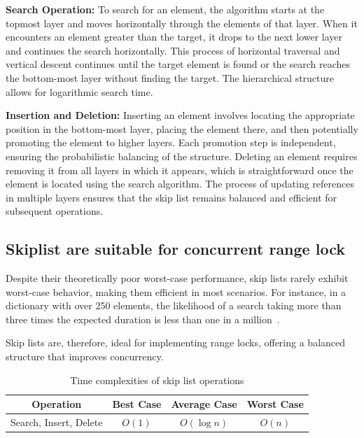 \textbf{Search Operation:} To search for an element, the algorithm starts at the topmost layer and moves horizontally through the elements of that layer.
When it encounters an element greater than the target, it drops to the next lower layer and continues the search horizontally.
This process of horizontal traversal and vertical descent continues until the target element is found or the search reaches the bottom-most layer without finding the target.
The hierarchical structure allows for logarithmic search time.

\textbf{Insertion and Deletion:} Inserting an element involves locating the appropriate position in the bottom-most layer, placing the element there, and then potentially promoting the element to higher layers.
Each promotion step is independent, ensuring the probabilistic balancing of the structure.
Deleting an element requires removing it from all layers in which it appears, which is straightforward once the element is located using the search algorithm.
The process of updating references in multiple layers ensures that the skip list remains balanced and efficient for subsequent operations.


\subsection*{Skiplist are suitable for concurrent range lock}
Despite their theoretically poor worst-case performance, skip lists rarely exhibit worst-case behavior, making them efficient in most scenarios.
For instance, in a dictionary with over 250 elements, the likelihood of a search taking more than three times the expected duration is less than one in a million~\parencite{pugh1990skip2}.

Skip lists are, therefore, ideal for implementing range locks, offering a balanced structure that improves concurrency.

\begin{table}[h!]
    \centering
    \begin{tabular}{|c|c|c|c|}
        \hline
        \textbf{Operation} & \textbf{Best Case} & \textbf{Average Case} & \textbf{Worst Case} \\ \hline
 Search, Insert, Delete & $O(1)$ & $O(\log n)$ & $O(n)$ \\ \hline
    \end{tabular}
    \caption{Time complexities of skip list operations}
    \label{tab:skiplisttimecomplexity}
\end{table}

